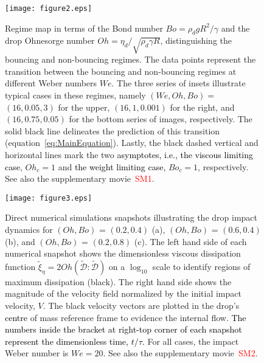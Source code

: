 \documentclass{jfm}
\newcommand*\red{\textcolor{red}}
\newcommand{\Ohn}{\mathit{Oh}}
\newcommand{\Ohc}{\mathit{Oh}_\mathit{c}}
\newcommand{\Wen}{\mathit{We}}
\newcommand{\Bon}{\mathit{Bo}}
\newcommand{\Boc}{\mathit{Bo}_\mathit{c}}
\newcommand{\revRev}[1]{\textcolor{black}{#1}}
\begin{document}
\begin{figure}
	\centering
	\texttt{[image: figure2.eps]}
	\caption{Regime map in terms of the Bond number $\Bon = \rho_dgR^2/\gamma$ and the drop Ohnesorge number $\Ohn = \eta_d/\sqrt{\rho_d\gamma R}$, distinguishing the bouncing and non-bouncing regimes. The data points represent the transition between the bouncing and non-bouncing regimes at different Weber numbers $\Wen$. The three series of insets illustrate typical cases in these regimes, namely $(\Wen, \Ohn, \Bon) = $ $(16, 0.05, 3)$ for the upper, $(16, 1, 0.001)$ for the right, and $(16, 0.75, 0.05)$ for the bottom series of images, respectively. The solid black line delineates the prediction of this transition (equation~\eqref{eq:MainEquation}). Lastly, the black dashed vertical and horizontal lines mark the two \revRev{asymptotes, i.e., the viscous limiting case}, $\Ohc = 1$ and \revRev{the weight limiting case,} $\Boc = 1$, respectively. See also the supplementary movie~\red{SM1}.}
	\label{fig:RegimeMap}
\end{figure}
\begin{figure}
	\centering
	\texttt{[image: figure3.eps]}
	\caption{Direct numerical simulations snapshots illustrating the drop impact dynamics for $\left(\Ohn, \Bon\right)$ = $\left(0.2, 0.4\right)$ (a), $\left(\Ohn, \Bon\right)$ = $\left(0.6, 0.4\right)$ (b), and $\left(\Ohn, \Bon\right)$ = $\left(0.2, 0.8\right)$ (c). The left hand side of each numerical snapshot shows the dimensionless viscous dissipation function $\tilde{\xi}_\eta = 2\Ohn\left(\boldsymbol{\tilde{\mathcal{D}}:\tilde{\mathcal{D}}}\right)$ on a $\log_{10}$ scale to identify regions of maximum dissipation (black). The right hand side shows the magnitude of the velocity field normalized by the initial impact velocity, $V$. The black velocity vectors are plotted in the drop's \revRev{centre} of mass reference frame to evidence the internal flow. \revRev{The numbers inside the bracket at right-top corner of each snapshot represent the dimensionless time, $t/\tau$.} For all cases, the impact Weber number is $\Wen = 20$. See also the supplementary movie~\red{SM2}.}
	\label{fig:Phenomenology}
\end{figure}
\end{document}
